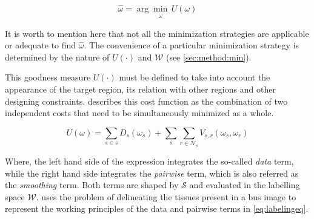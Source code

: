 \begin{equation}
\hat{\omega} = \arg \min_{\substack{\omega}} \,U(\omega)
\label{eq:costMin}
\end{equation}

It is worth to mention here that not all the minimization strategies are applicable or adequate to find $\hat{\omega}$.
The convenience of a particular minimization strategy is determined by the nature of $U(\cdot)$ and $\mathcal{W}$ (see \cref{sec:method:min}).

This goodness measure $U(\cdot)$ must be defined to take into account the appearance of the target region, its relation with other regions and other designing constraints.
 describes this cost function as the combination of two independent costs that need to be simultaneously minimized as a whole.

\begin{equation}
  U(\omega) = \sum_{s\in s} D_s(\omega_s) + \sum_{s}\sum_{r \in \mathcal{N}_{s}} V_{s,r}(\omega_s,\omega_r)
  \label{eq:labelingeq}
\end{equation}

Where, the left hand side of the expression integrates the so-called \emph{data} term, while the right hand side integrates the \emph{pairwise} term, which is also referred as the \emph{smoothing} term.
Both terms are shaped by $\mathcal{S}$ and evaluated in the labelling space $\mathcal{W}$.
 uses the problem of delineating the tissues present in a \ac{bus} image to represent the working principles of the data and pairwise terms in \cref{eq:labelingeq}.

